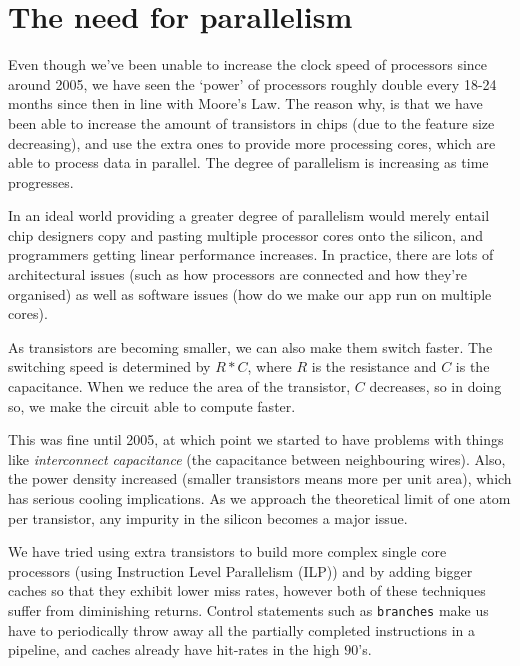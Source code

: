 
\section{The need for parallelism}

Even though we've been unable to increase the clock speed of processors since
around 2005, we have seen the `power' of processors roughly double every 18-24
months since then in line with Moore's Law. The reason why, is that we have been
able to increase the amount of transistors in chips (due to the feature size
decreasing), and use the extra ones to provide more processing cores, which are
able to process data in parallel. The degree of parallelism is increasing as
time progresses.

In an ideal world providing a greater degree of parallelism would merely entail
chip designers copy and pasting multiple processor cores onto the silicon, and
programmers getting linear performance increases. In practice, there are lots of
architectural issues (such as how processors are connected and how they're
organised) as well as software issues (how do we make our app run on multiple
cores).

As transistors are becoming smaller, we can also make them switch faster. The
switching speed is determined by $R*C$, where $R$ is the resistance and $C$ is
the capacitance. When we reduce the area of the transistor, $C$ decreases, so in
doing so, we make the circuit able to compute faster.

This was fine until 2005, at which point we started to have problems with things
like \textit{interconnect capacitance} (the capacitance between neighbouring
wires). Also, the power density increased (smaller transistors means more per
unit area), which has serious cooling implications. As we approach the
theoretical limit of one atom per transistor, any impurity in the silicon
becomes a major issue.

We have tried using extra transistors to build more complex single core
processors (using Instruction Level Parallelism (ILP)) and by adding bigger
caches so that they exhibit lower miss rates, however both of these techniques
suffer from diminishing returns. Control statements such as \texttt{branches}
make us have to periodically throw away all the partially completed instructions
in a pipeline, and caches already have hit-rates in the high $90$'s.

